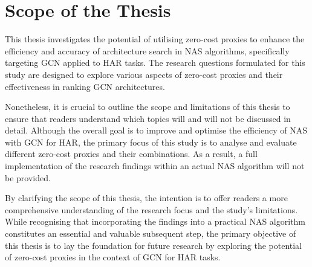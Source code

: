 \section{Scope of the Thesis}

This thesis investigates the potential of utilising zero-cost proxies to enhance the efficiency and accuracy of architecture search in NAS algorithms, specifically targeting GCN applied to HAR tasks. The research questions formulated for this study are designed to explore various aspects of zero-cost proxies and their effectiveness in ranking GCN architectures.

Nonetheless, it is crucial to outline the scope and limitations of this thesis to ensure that readers understand which topics will and will not be discussed in detail. Although the overall goal is to improve and optimise the efficiency of NAS with GCN for HAR, the primary focus of this study is to analyse and evaluate different zero-cost proxies and their combinations. As a result, a full implementation of the research findings within an actual NAS algorithm will not be provided.

By clarifying the scope of this thesis, the intention is to offer readers a more comprehensive understanding of the research focus and the study's limitations. While recognising that incorporating the findings into a practical NAS algorithm constitutes an essential and valuable subsequent step, the primary objective of this thesis is to lay the foundation for future research by exploring the potential of zero-cost proxies in the context of GCN for HAR tasks.